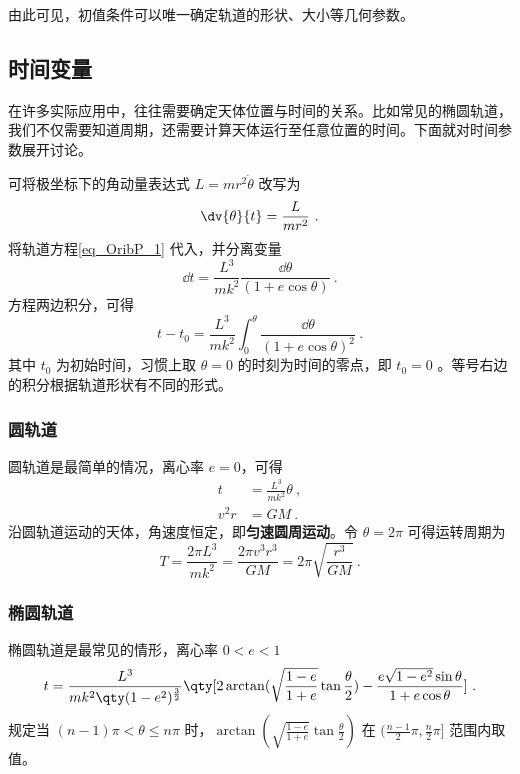 由此可见，初值条件可以唯一确定轨道的形状、大小等几何参数。

\subsection{时间变量}
在许多实际应用中，往往需要确定天体位置与时间的关系。比如常见的椭圆轨道，我们不仅需要知道周期，还需要计算天体运行至任意位置的时间。下面就对时间参数展开讨论。

可将极坐标下的角动量表达式 $ L  = mr^2\dot{\theta}$ 改写为
\begin{equation} 
\dv{\theta}{t}=\frac{L}{mr^2}~.
\end{equation}
将轨道方程\autoref{eq_OribP_1} 代入，并分离变量
\begin{equation}
\dd{t}=\frac{L^3}{mk^2}\frac{\dd{\theta}}{(1+e\cos\theta)}~.
\end{equation}
方程两边积分，可得
\begin{equation}\label{eq_OribP_11}
t-t_0 = \frac{L^3}{mk^2}\int_0^{\theta} \frac{\dd{\theta}}{(1+e\cos\theta)^2}~.
\end{equation}
其中 $t_0$ 为初始时间，习惯上取 $\theta=0$ 的时刻为时间的零点，即 $t_0=0$ 。等号右边的积分根据轨道形状有不同的形式。

\subsubsection{圆轨道}
圆轨道是最简单的情况，离心率 $e=0$，可得
\begin{equation}
\begin{aligned}
t &=\frac{L^3}{mk^2}\theta ~,\\
v^2r &=GM ~.
\end{aligned}
\end{equation}
沿圆轨道运动的天体，角速度恒定，即\textbf{匀速圆周运动}。令 $\theta=2\pi$ 可得运转周期为
\begin{equation}
T=\frac{2\pi L^3}{mk^2}=\frac{2\pi v^3r^3}{GM}=2\pi \sqrt{\frac{r^3}{GM}}~.
\end{equation}

\subsubsection{椭圆轨道}
椭圆轨道是最常见的情形，离心率 $0<e<1$
\begin{equation}\label{eq_OribP_14}
t = \frac{L^3}{mk^2\qty(1-e^2)^{\frac{3}{2}}}\qty[2\arctan(\sqrt{\frac{1-e}{1+e}}\tan\frac{\theta}{2})-\frac{e\sqrt{1-e^2}\sin\theta}{1+e\cos\theta}]~.
\end{equation}
规定当 $(n-1)\pi<\theta \leqslant n\pi$ 时，$\arctan(\sqrt{\frac{1-e}{1+e}}\tan\frac{\theta}{2})$ 在 $(\frac{n-1}{2}\pi,\frac{n}{2}\pi]$ 范围内取值。

